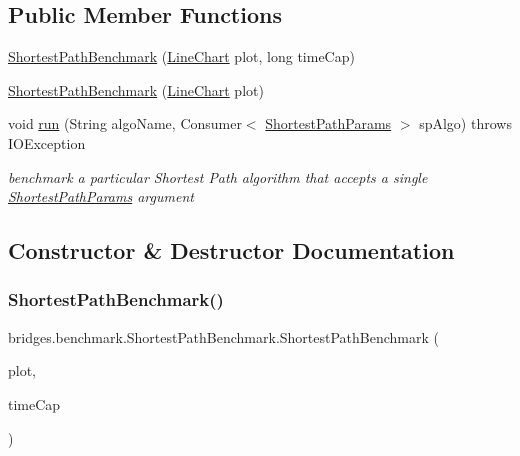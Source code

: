 \subsection*{Public Member Functions}
\begin{DoxyCompactItemize}
\item 
\mbox{\hyperlink{classbridges_1_1benchmark_1_1_shortest_path_benchmark_ad878c2ad9c6912170601092423c54c43}{Shortest\+Path\+Benchmark}} (\mbox{\hyperlink{classbridges_1_1base_1_1_line_chart}{Line\+Chart}} plot, long time\+Cap)
\item 
\mbox{\hyperlink{classbridges_1_1benchmark_1_1_shortest_path_benchmark_ac84a2afc6e663b9d4edc61b3d4c4701c}{Shortest\+Path\+Benchmark}} (\mbox{\hyperlink{classbridges_1_1base_1_1_line_chart}{Line\+Chart}} plot)
\item 
void \mbox{\hyperlink{classbridges_1_1benchmark_1_1_shortest_path_benchmark_ad7e6918e142cfbdaac08493ccbf02acf}{run}} (String algo\+Name, Consumer$<$ \mbox{\hyperlink{classbridges_1_1benchmark_1_1_shortest_path_params}{Shortest\+Path\+Params}} $>$ sp\+Algo)  throws I\+O\+Exception 
\begin{DoxyCompactList}\small\item\em benchmark a particular Shortest Path algorithm that accepts a single \mbox{\hyperlink{classbridges_1_1benchmark_1_1_shortest_path_params}{Shortest\+Path\+Params}} argument \end{DoxyCompactList}\end{DoxyCompactItemize}


\subsection{Constructor \& Destructor Documentation}
\mbox{\label{classbridges_1_1benchmark_1_1_shortest_path_benchmark_ad878c2ad9c6912170601092423c54c43}} 
\subsubsection{\texorpdfstring{Shortest\+Path\+Benchmark()}{ShortestPathBenchmark()}\hspace{0.1cm}{\footnotesize\ttfamily [1/2]}}
{\footnotesize\ttfamily bridges.\+benchmark.\+Shortest\+Path\+Benchmark.\+Shortest\+Path\+Benchmark (\begin{DoxyParamCaption}\item[{\mbox{\hyperlink{classbridges_1_1base_1_1_line_chart}{Line\+Chart}}}]{plot,  }\item[{long}]{time\+Cap }\end{DoxyParamCaption})}

